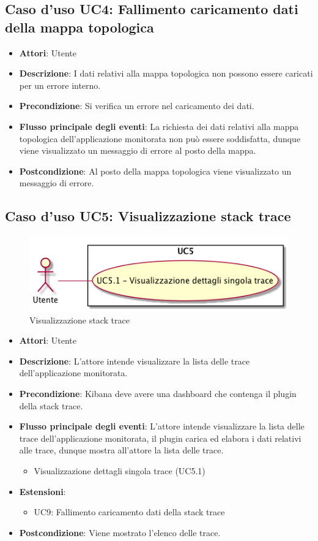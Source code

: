 \hypertarget{UC4}{}
\subsection{Caso d'uso UC4: Fallimento caricamento dati della mappa topologica}
\begin{itemize}
	\item \textbf{Attori}: Utente
	\item \textbf{Descrizione}: I dati relativi alla mappa topologica non possono essere caricati per un errore interno.
	\item \textbf{Precondizione}: Si verifica un errore nel caricamento dei dati.
	\item \textbf{Flusso principale degli eventi}: La richiesta dei dati relativi alla mappa topologica dell'applicazione monitorata non può essere soddisfatta, dunque viene visualizzato un messaggio di errore al posto della mappa.
	\item \textbf{Postcondizione}: Al posto della mappa topologica viene visualizzato un messaggio di errore.
\end{itemize}

 \hypertarget{UC5}{}
\subsection{Caso d'uso UC5: Visualizzazione stack trace}
\begin{figure} [H]
	\centering
	\includegraphics[scale=0.45]{./UC/UC5.png}
	\caption{Visualizzazione stack trace}\label{}
\end{figure}
\begin{itemize}
	\item \textbf{Attori}: Utente
	\item \textbf{Descrizione}: L'attore intende visualizzare la lista delle trace dell'applicazione monitorata.
	\item \textbf{Precondizione}: Kibana deve avere una dashboard che contenga il plugin della stack trace.
	\item \textbf{Flusso principale degli eventi}: L'attore intende visualizzare la lista delle trace dell'applicazione monitorata, il plugin carica ed elabora i dati relativi alle trace, dunque mostra all'attore la lista delle trace.
	\begin{itemize}
		\item Visualizzazione dettagli singola trace (UC5.1)
	\end{itemize}
	\item 	\textbf{Estensioni}:
	\begin{itemize}
		\item UC9: Fallimento caricamento dati della stack trace
	\end{itemize}
	\item \textbf{Postcondizione}: Viene mostrato l'elenco delle trace.
\end{itemize}

